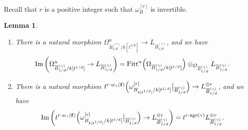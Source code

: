 \documentclass[a4paper,11pt]{amsart}
\newtheorem{lem}[thm]{Lemma}
\theoremstyle{definition}
\theoremstyle{remark}
\begin{document}
Recall that $r$ is a positive integer such that $\omega _{B}^{[r]}$ is invertible.

\begin{lem}\label{lem:L}
\begin{enumerate}
\item
There is a natural morphism $\Omega ^n _{\overline{B}^{(\gamma)}_{1/d}/k[t^{1/d}]} \to L_{\overline{B}^{(\gamma)}_{1/d}}$, and we have
\[
\operatorname{Im} \left ( \Omega ^n _{\overline{B}^{(\gamma)}_{1/d}/k[t^{1/d}]} \to L_{\overline{B}^{(\gamma)}_{1/d}} \right)  = \operatorname{Fitt}^n \Bigl ( \Omega _{\overline{B}^{(\gamma)}_{1/d}/k[t^{1/d}]} \Bigr ) \otimes _{\mathcal{O}_{\overline{B}^{(\gamma)}_{1/d}}} L_{\overline{B}^{(\gamma)}_{1/d}}.
\]  

\item
There is a natural morphism $t^{r \cdot w_{\gamma}({\bf f})} \Bigl ( \omega^{[r]} _{B_{k[t^{1/d}]}/k[t^{1/d}]} \big| _{\overline{B}^{(\gamma)}_{1/d}} \Bigr ) \to L_{\overline{B}^{(\gamma)}_{1/d}}^{\otimes r}$, 
and we have
\[
\operatorname{Im} \left (t^{r \cdot w_{\gamma}({\bf f})} \Bigl ( \omega^{[r]} _{B_{k[t^{1/d}]}/k[t^{1/d}]} \big| _{\overline{B}^{(\gamma)}_{1/d}} \Bigr ) \to L_{\overline{B}^{(\gamma)}_{1/d}}^{\otimes r} \right)
= t^{r \cdot \operatorname{age}(\gamma)} L_{\overline{B}^{(\gamma)}_{1/d}}^{\otimes r}. 
\]
\end{enumerate}
\end{lem}
\end{document}
